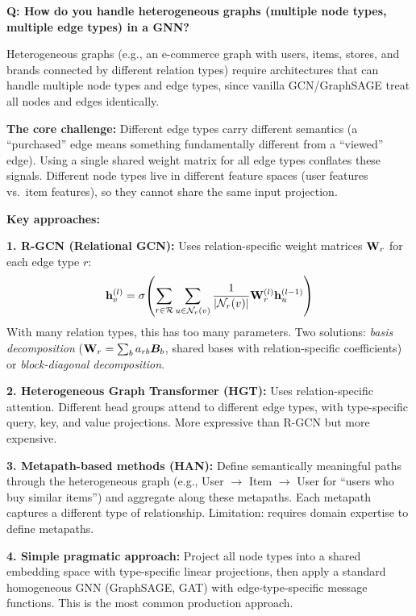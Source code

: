 \begin{interviewq}
\textbf{Q: How do you handle heterogeneous graphs (multiple node types, multiple edge types) in a GNN?}

 \quad {} \quad \badgefreq{\freqmed}

\stronganswer

Heterogeneous graphs (e.g., an e-commerce graph with users, items, stores, and brands connected by different relation types) require architectures that can handle multiple node types and edge types, since vanilla GCN/GraphSAGE treat all nodes and edges identically.

\textbf{The core challenge:} Different edge types carry different semantics (a ``purchased'' edge means something fundamentally different from a ``viewed'' edge). Using a single shared weight matrix for all edge types conflates these signals. Different node types live in different feature spaces (user features vs.\ item features), so they cannot share the same input projection.

\textbf{Key approaches:}

\textbf{1. R-GCN (Relational GCN):} Uses relation-specific weight matrices $\mathbf{W}_r$ for each edge type $r$:
\[
\mathbf{h}_v^{(l)} = \sigma\!\left(\sum_{r \in \mathcal{R}} \sum_{u \in \mathcal{N}_r(v)} \frac{1}{|\mathcal{N}_r(v)|} \mathbf{W}_r^{(l)} \mathbf{h}_u^{(l-1)}\right)
\]
With many relation types, this has too many parameters. Two solutions: \textit{basis decomposition} ($\mathbf{W}_r = \sum_b a_{rb} \bm{B}_b$, shared bases with relation-specific coefficients) or \textit{block-diagonal decomposition}.

\textbf{2. Heterogeneous Graph Transformer (HGT):} Uses relation-specific attention. Different head groups attend to different edge types, with type-specific query, key, and value projections. More expressive than R-GCN but more expensive.

\textbf{3. Metapath-based methods (HAN):} Define semantically meaningful paths through the heterogeneous graph (e.g., User $\to$ Item $\to$ User for ``users who buy similar items'') and aggregate along these metapaths. Each metapath captures a different type of relationship. Limitation: requires domain expertise to define metapaths.

\textbf{4. Simple pragmatic approach:} Project all node types into a shared embedding space with type-specific linear projections, then apply a standard homogeneous GNN (GraphSAGE, GAT) with edge-type-specific message functions. This is the most common production approach.


\end{interviewq}
